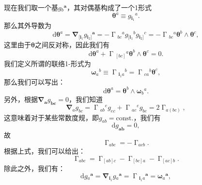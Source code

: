 现在我们取一个基$g{_{b}}^{\boldsymbol{a}}$，其对偶基构成了一个1形式
\begin{equation*}
	\boldsymbol{\theta}^{a} \equiv g{_{\boldsymbol{i}_{1}}}^{a} .
\end{equation*}
那么其外导数为
\begin{equation*}
	\mathrm{d}\boldsymbol{\theta}^{a} =\boldsymbol{\nabla }_{[\boldsymbol{i}_{1}} g{_{\boldsymbol{i}_{2}]}}^{\boldsymbol{a}} =-\upGamma {_{bc}}^{a} g{_{[\boldsymbol{i}_{1}}}^{b} g{_{\boldsymbol{i}_{2}]}}^{c} =-\upGamma {_{bc}}^{a}\boldsymbol{\theta}^{b} \land \boldsymbol{\theta}^{c} ,
\end{equation*}
这里由于$\boldsymbol{\theta}$之间反对称，因此我们有
\begin{equation}
	\mathrm{d}\boldsymbol{\theta}^{a} +\upGamma {_{[ bc]}}^{a}\boldsymbol{\theta}^{b} \land \boldsymbol{\theta}^{c} =0.
	\label{eq:5.87}
\end{equation}
我们定义所谓的联络1-形式为
\begin{equation*}
	\boldsymbol{\omega}{_{a}}^{b} \equiv \upGamma {_{\boldsymbol{i}_{1} a}}^{b} =\upGamma {_{ca}}^{b}\boldsymbol{\theta}^{c} ,
\end{equation*}
那么我们可以写出：
\begin{equation*}
	\mathrm{d}\boldsymbol{\theta}^{a} =\boldsymbol{\theta}^{b} \land \boldsymbol{\omega}{_{b}}^{a} .
\end{equation*}
另外，根据$\boldsymbol{\nabla }_{\boldsymbol{a}} g_{\boldsymbol{bc}} =0$，我们知道
\begin{equation*}
	\boldsymbol{\nabla }_{a} g_{bc} =\upGamma {_{ab}}^{e} g_{ec} +\upGamma {_{ac}}^{e} g_{be} =2\upGamma _{a( bc)} ,
\end{equation*}
这意味着对于某些常数度规，即$g_{ab} =\mathrm{const.}$，我们有
\begin{equation*}
	\mathrm{d} g_{\boldsymbol{ab}} =0,
\end{equation*}
故
\begin{equation*}
	\upGamma _{abc} =-\upGamma _{acb} .
\end{equation*}
根据上式，我们可以给出：
\begin{equation*}
	\upGamma _{abc} =\upGamma _{[ ab] c} -\upGamma _{[ bc] a} -\upGamma _{[ ac] b} .
\end{equation*}
除此之外，我们有：
\begin{equation*}
	\mathrm{d} g{_{a}}^{\boldsymbol{a}} =\boldsymbol{\nabla }_{\boldsymbol{i}_{1}} g{_{a}}^{\boldsymbol{a}} =\upGamma {_{\boldsymbol{i}_{1} a}}^{\boldsymbol{a}} =\boldsymbol{\omega}{_{a}}^{\boldsymbol{a}} ,
\end{equation*}
